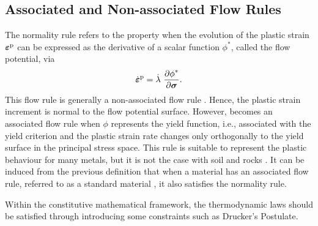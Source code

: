 \subsection{Associated and Non-associated Flow Rules}
The normality rule refers to the property when the evolution of the plastic strain $\mbox{$\bm \varepsilon $}^{\rm{p}}$ can be expressed as the derivative of a scalar function $\phi^\ast$, called the flow potential, via
\begin{equation}
	{\dot{\mbox{$\bm \varepsilon $}}}^{\rm p} = \dot{\lambda} \  \displaystyle\frac{\displaystyle\partial \phi^\ast}{\displaystyle\partial \mbox{$\bm \sigma$}}.
	\label{eq:normality}
\end{equation}
This flow rule is generally a non-associated flow rule \parencite{lubliner2008plasticity}. Hence, the plastic strain increment is normal to the flow potential surface. However,  becomes an associated flow rule when $\phi$ represents the yield function, i.e., associated with the yield criterion and the plastic strain rate changes only orthogonally to the yield surface in the principal stress space. This rule is suitable to represent the plastic behaviour for many metals, but it is not the case with soil and rocks \parencite{kelly2016}. It can be induced from the previous definition that when a material has an associated flow rule, referred to as a standard material \parencite{lubliner2008plasticity}, it also satisfies the normality rule.

Within the constitutive mathematical framework, the thermodynamic laws should be satisfied through introducing some constraints such as Drucker's Postulate.

